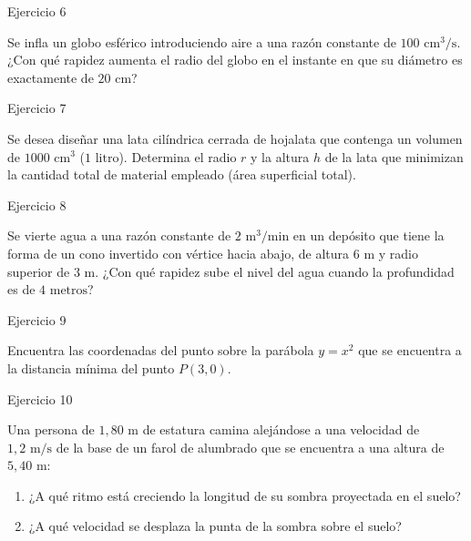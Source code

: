 \documentclass[aspectratio=169]{beamer}
\begin{document}
\begin{frame}{Ejercicio 6}
  \begin{mwejercicio}
    Se infla un globo esférico introduciendo aire a una razón constante de $100\text{ cm}^3\text{/s}$. ¿Con qué rapidez aumenta el radio del globo en el instante en que su diámetro es exactamente de $20\text{ cm}$?
  \end{mwejercicio}
  \vspace{3.5cm}
\end{frame}
\begin{frame}{Ejercicio 7}
  \begin{mwejercicio}
    Se desea diseñar una lata cilíndrica cerrada de hojalata que contenga un volumen de $1000\text{ cm}^3$ ($1\text{ litro}$). Determina el radio $r$ y la altura $h$ de la lata que minimizan la cantidad total de material empleado (área superficial total).
  \end{mwejercicio}
  \vspace{3.5cm}
\end{frame}
\begin{frame}{Ejercicio 8}
  \begin{mwejercicio}
    Se vierte agua a una razón constante de $2\text{ m}^3\text{/min}$ en un depósito que tiene la forma de un cono invertido con vértice hacia abajo, de altura $6\text{ m}$ y radio superior de $3\text{ m}$. ¿Con qué rapidez sube el nivel del agua cuando la profundidad es de $4\text{ metros}$?
  \end{mwejercicio}
  \vspace{3.5cm}
\end{frame}
\begin{frame}{Ejercicio 9}
  \begin{mwejercicio}
    Encuentra las coordenadas del punto sobre la parábola $y = x^2$ que se encuentra a la distancia mínima del punto $P(3, 0)$.
  \end{mwejercicio}
  \vspace{3.5cm}
\end{frame}
\begin{frame}{Ejercicio 10}
  \begin{mwejercicio}
    Una persona de $1{,}80\text{ m}$ de estatura camina alejándose a una velocidad de $1{,}2\text{ m/s}$ de la base de un farol de alumbrado que se encuentra a una altura de $5{,}40\text{ m}$:
    \begin{enumerate}
      \item ¿A qué ritmo está creciendo la longitud de su sombra proyectada en el suelo?
      \item ¿A qué velocidad se desplaza la punta de la sombra sobre el suelo?
    \end{enumerate}
  \end{mwejercicio}
  \vspace{2.5cm}
\end{frame}
\end{document}
